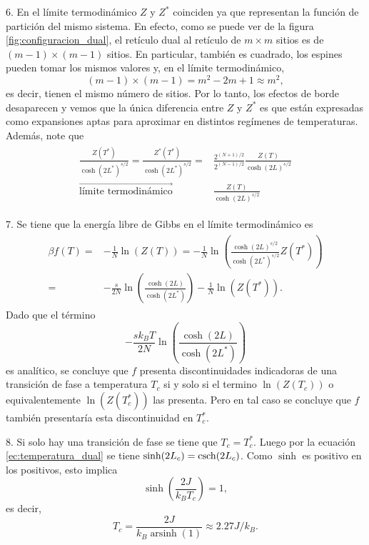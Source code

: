 \documentclass{article}
\DeclareMathOperator{\arsinh}{arsinh}
\begin{document}
6. En el límite termodinámico $Z$ y $Z^*$ coinciden ya que representan la función de partición del mismo sistema. En efecto, como se puede ver de la figura \ref{fig:configuracion_dual}, el retículo dual al retículo de $m\times m$ sitios es de $(m-1)\times (m-1)$ sitios. En particular, también es cuadrado, los espines pueden tomar los mismos valores y, en el límite termodinámico,
\begin{equation}
(m-1)\times(m-1)=m^2-2m+1\approx m^2,
\end{equation}
es decir, tienen el mismo número de sitios. Por lo tanto, los efectos de borde desaparecen y vemos que la única diferencia entre $Z$ y $Z^*$ es que están expresadas como expansiones aptas para aproximar en distintos regímenes de temperaturas. Además, note que
\begin{align}
\begin{split}
\frac{Z(T^*)}{\cosh(2L^*)^{s/2}}=\frac{Z^*(T^*)}{\cosh(2L^*)^{s/2}}=&\frac{2^{(N+1)/2}}{2^{(N-1)/2}}\frac{Z(T)}{\cosh(2L)^{s/2}}\\
\overrightarrow{\text{límite termodinámico}}\qquad&\frac{Z(T)}{\cosh(2L)^{s/2}}
\end{split}
\end{align}

7. Se tiene que la energía libre de Gibbs en el límite termodinámico es 
\begin{align}
\begin{split}
\beta f(T)=&-\frac{1}{N}\ln(Z(T))=-\frac{1}{N}\ln(\frac{\cosh(2L)^{s/2}}{\cosh(2L^*)^{s/2}}Z(T^*))\\
=&-\frac{s}{2N}\ln(\frac{\cosh(2L)}{\cosh(2L^*)})-\frac{1}{N}\ln(Z(T^*)).
\end{split}
\end{align}
Dado que el término 
\begin{equation}
-\frac{sk_B T}{2N}\ln(\frac{\cosh(2L)}{\cosh(2L^*)})
\end{equation}
es analítico, se concluye que $f$ presenta discontinuidades indicadoras de una transición de fase a temperatura $T_c$ si y solo si el termino $\ln(Z(T_c))$ o equivalentemente $\ln(Z(T^*_c))$ las presenta. Pero en tal caso se concluye que $f$ también presentaría esta discontinuidad en $T_c^*$. 

8. Si solo hay una transición de fase se tiene que $T_c=T_c^*$. Luego por la ecuación \eqref{ec:temperatura_dual} se tiene $\sinh(2L_c)=\csch(2L_c)$. Como $\sinh$ es positivo en los positivos, esto implica
\begin{equation}
\sinh(\frac{2J}{k_B T_c})=1,
\end{equation}
es decir,
\begin{equation}\label{ec:temperatura_critica}
T_c=\frac{2J}{k_B\arsinh(1)}\approx 2.27J/k_B.
\end{equation}
\end{document}
